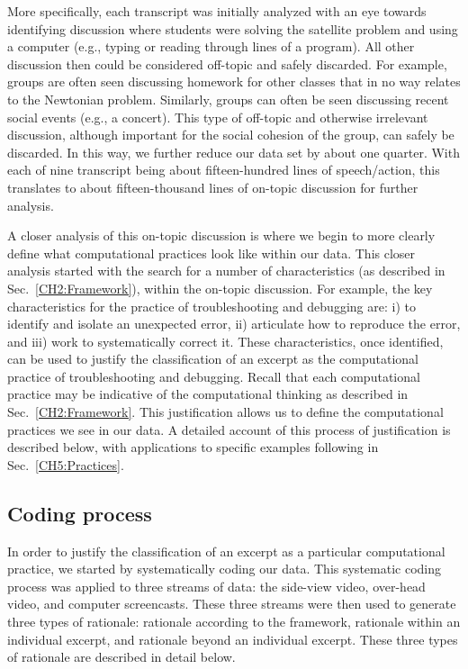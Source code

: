 \documentclass{msuphddissertation}
\begin{document}
\begin{doublespace}
More specifically, each transcript was initially analyzed with an eye towards identifying discussion where students were solving the satellite problem and using a computer (e.g., typing or reading through lines of a program).  All other discussion then could be considered off-topic and safely discarded.  For example, groups are often seen discussing homework for other classes that in no way relates to the Newtonian problem.  Similarly, groups can often be seen discussing recent social events (e.g., a concert).  This type of off-topic and otherwise irrelevant discussion, although important for the social cohesion of the group, can safely be discarded.  In this way, we further reduce our data set by about one quarter.  With each of nine transcript being about fifteen-hundred lines of speech/action, this translates to about fifteen-thousand lines of on-topic discussion for further analysis.

A closer analysis of this on-topic discussion is where we begin to more clearly define what computational practices look like within our data.  This closer analysis started with the search for a number of characteristics (as described in Sec.~\ref{CH2:Framework}), within the on-topic discussion.  For example, the key characteristics for the practice of troubleshooting and debugging are: i) to identify and isolate an unexpected error, ii) articulate how to reproduce the error, and iii) work to systematically correct it.  These characteristics, once identified, can be used to justify the classification of an excerpt as the computational practice of troubleshooting and debugging.  Recall that each computational practice may be indicative of the computational thinking as described in Sec.~\ref{CH2:Framework}.  This justification allows us to define the computational practices we see in our data.  A detailed account of this process of justification is described below, with applications to specific examples following in Sec.~\ref{CH5:Practices}.

\subsection{Coding process}\label{CH5:CodingProcess}

In order to justify the classification of an excerpt as a particular computational practice, we started by systematically coding our data.  This systematic coding process was applied to three streams of data: the side-view video, over-head video, and computer screencasts.  These three streams were then used to generate three types of rationale: rationale according to the framework, rationale within an individual excerpt, and rationale beyond an individual excerpt.  These three types of rationale are described in detail below.


\end{doublespace}
\end{document}
